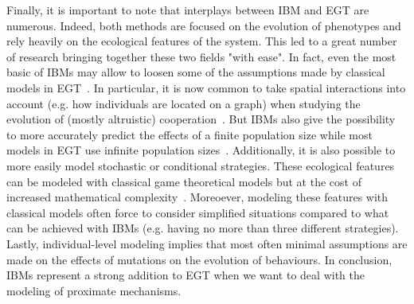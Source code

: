         Finally, it is important to note that interplays between IBM and EGT are numerous. Indeed, both methods are focused on the evolution of phenotypes and rely heavily on the ecological features of the system. This led to a great number of research bringing together these two fields "with ease". In fact, even the most basic of IBMs may allow to loosen some of the assumptions made by classical models in EGT~\parencite{Adami2014}. In particular, it is now common to take spatial interactions into account (e.g. how individuals are located on a graph) when studying the evolution of (mostly altruistic) cooperation~\parencite{Hauert2004}. But IBMs also give the possibility to more accurately predict the effects of a finite population size while most models in EGT use infinite population sizes~\parencite{Hauert2009}. Additionally, it is also possible to more easily model stochastic or conditional strategies. These ecological features can be modeled with classical game theoretical models but at the cost of increased mathematical complexity~\parencite{Hauert2009}. Moreoever, modeling these features with classical models often force to consider simplified situations compared to what can be achieved with IBMs (e.g. having no more than three different strategies). Lastly, individual-level modeling implies that most often minimal assumptions are made on the effects of mutations on the evolution of behaviours. In conclusion, IBMs represent a strong addition to EGT when we want to deal with the modeling of proximate mechanisms.



